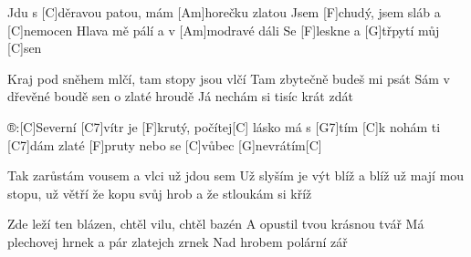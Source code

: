 
Jdu s [C]děravou patou, mám [Am]horečku zlatou
Jsem [F]chudý, jsem sláb a [C]nemocen
Hlava mě pálí a v [Am]modravé dáli
Se [F]leskne a [G]třpytí můj [C]sen

Kraj pod sněhem mlčí, tam stopy jsou vlčí
Tam zbytečně budeš mi psát
Sám v dřevěné boudě sen o zlaté hroudě
Já nechám si tisíc krát zdát

®:[C]Severní [C7]vítr je [F]krutý, 
počítej[C] lásko má s [G7]tím
[C]k nohám ti [C7]dám zlaté [F]pruty
nebo se [C]vůbec [G]nevrátím[C]

Tak zarůstám vousem a vlci už jdou sem
Už slyším je výt blíž a blíž
už mají mou stopu, už větří že kopu
svůj hrob a že stloukám si kříž

Zde leží ten blázen, chtěl vilu, chtěl bazén
A opustil tvou krásnou tvář
Má plechovej hrnek a pár zlatejch zrnek
Nad hrobem polární zář
